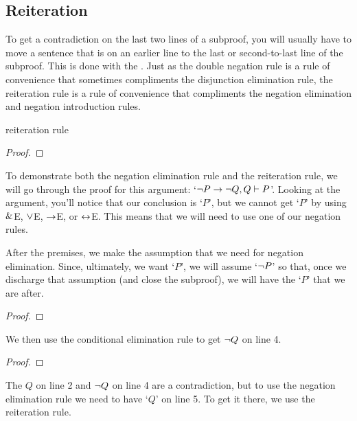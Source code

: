 

\subsection{Reiteration}

To get a contradiction on the last two lines of a subproof, you will usually have to move a sentence that is on an earlier line to the last or second-to-last line of the subproof. This is done with the . Just as the double negation rule is a rule of convenience that sometimes compliments the disjunction elimination rule, the reiteration rule is a rule of convenience that compliments the negation elimination and negation introduction rules.  

\begin{factboxy-width}[width=7.5cm]{reiteration rule}
\begin{proof}
	 
\end{proof}
\end{factboxy-width}

To demonstrate both the negation elimination rule and the reiteration rule, we will go through the proof for this argument: `${\neg} P \rightarrow {\neg} Q, Q \vdash P$'. Looking at the argument, you'll notice that our conclusion is `$P$', but we cannot get `$P$' by using $\mathbin{\&}$E, $\vee$E, $\rightarrow$E, or $\leftrightarrow$E. This means that we will need to use one of our negation rules.

After the premises, we make the assumption that we need for negation elimination. Since, ultimately, we want `$P$', we will assume `${\neg} P$' so that, once we discharge that assumption (and close the subproof), we will have the `$P$' that we are after.

\begin{proof}
	 \pr{}	
	 \pr{}
	\open
		\as{}
\end{proof}
We then use the conditional elimination rule to get ${\neg} Q$ on line 4. 
\begin{proof}
	 \pr{}	
	 \pr{}
	\open
		\as{}
\end{proof}
The $Q$ on line 2 and ${\neg} Q$ on line 4 are a contradiction, but to use the negation elimination rule we need to have `$Q$' on line 5. To get it there, we use the reiteration rule. 

